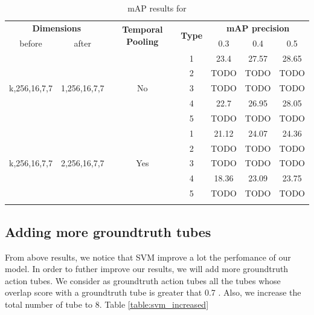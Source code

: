 \documentclass{report}
\begin{document}
\begin{center}
\begin{longtable}{||c | c| c| c||c c c||}

  \hline
 \multicolumn{2}{||c|}{\textbf{Dimensions}} & \multirow{2}{4.5em}{\textbf{Temporal Pooling}} &\multirow{2}{*}{ \textbf{Type}} &\multicolumn{3}{|c||}{\textbf{mAP precision}}\\

  before & after & {} & {} & 0.3 &  0.4 & 0.5 \\
  \hline   \hline

  \multirow{5}{*}{k,256,16,7,7} & \multirow{5}{*}{1,256,16,7,7} & \multirow{5}{*}{No}  & 1 & 23.4 & 27.57 &28.65  \\
  \cline{4-7}

  {} & {} & {} & 2 & TODO & TODO & TODO \\
  \cline{4-7}
  {} & {} & {} & 3 & TODO & TODO & TODO \\
  \cline{4-7}
  {} & {} & {} & 4 & 22.7 & 26.95 & 28.05 \\
  \cline{4-7}
  {} & {} & {} & 5 & TODO & TODO & TODO \\
  \hline

  \multirow{5}{*}{k,256,16,7,7} & \multirow{5}{*}{2,256,16,7,7} & \multirow{5}{*}{Yes}  & 1 & 21.12 & 24.07 & 24.36  \\
  \cline{4-7}

  {} & {} & {} & 2 & TODO & TODO & TODO \\
  \cline{4-7}
  {} & {} & {} & 3 & TODO & TODO & TODO \\
  \cline{4-7}
  {} & {} & {} & 4 & 18.36 & 23.09 & 23.75 \\
  \cline{4-7}
  
  {} & {} & {} & 5 & TODO & TODO & TODO \\
  \hline
  \caption{mAP results for   }
  \label{table:svm_temp_pooling_16}
\end{longtable} 
\end{center}

\subsection{Adding more groundtruth tubes}
From above results, we notice that SVM improve a lot the perfomance of our model. In order to futher improve our results, we will
add more groundtruth action tubes. We consider as groundtruth action tubes all the tubes whose overlap score  with a groundtruth tube is
greater that 0.7 . Also, we increase the total number of tube to 8. Table \ref{table:svm_increased}
\end{document}
